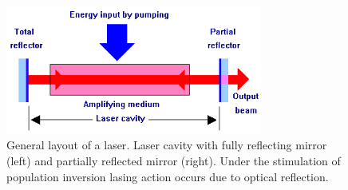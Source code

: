 \begin{figure}[ht!]
\centering
\includegraphics[width=0.75\textwidth]{chapters/img/laser_cavity.PNG}
\caption{General layout of a \acs{laser}. Laser cavity with fully reflecting mirror (left) and partially reflected mirror (right). Under the stimulation of population inversion lasing action occurs due to optical reflection.}
\label{fig:laser_cavity}
\end{figure}

